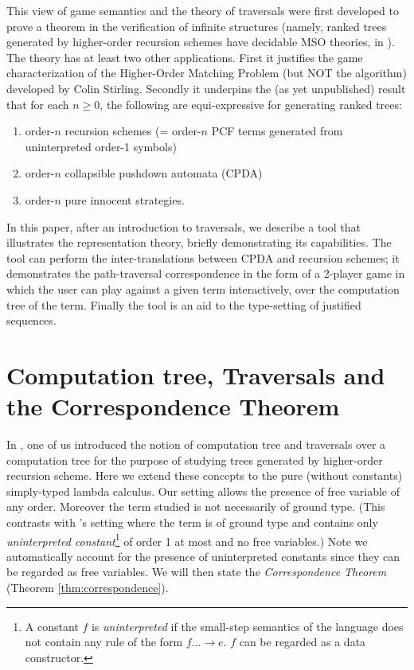 This view of game semantics and the theory of traversals were first developed to prove a theorem in the verification of infinite structures (namely, ranked trees generated by higher-order recursion schemes have decidable MSO theories, in \cite{OngLics2006}). The theory has at least two other applications. First it justifies the game characterization of the Higher-Order Matching Problem (but NOT the algorithm) developed by Colin Stirling. Secondly it underpins the (as yet unpublished) result that for each $n \geq 0$, the following are equi-expressive for generating ranked trees:
\begin{enumerate}
\item order-$n$ recursion schemes (= order-$n$ PCF terms generated from uninterpreted order-1 symbols)

\item order-$n$ collapsible pushdown automata (CPDA)

\item order-$n$ pure innocent strategies.
\end{enumerate}

In this paper, after an introduction to traversals, we describe a tool that illustrates the representation theory, briefly demonstrating its capabilities. The tool can perform the inter-translations between CPDA and recursion schemes; it demonstrates the path-traversal correspondence in the form of a 2-player game in which the user can play against a given term interactively, over the computation tree of the term. Finally the tool is an aid to the type-setting of justified sequences.

\section{Computation tree, Traversals and the Correspondence Theorem}

In \cite{OngLics2006}, one of us introduced the notion of computation tree and traversals over a computation tree for the purpose of studying trees generated by higher-order recursion scheme. Here we extend these concepts to the pure (\ie without constants) simply-typed lambda calculus. Our setting allows the presence of free variable of any order. Moreover the term studied is not necessarily of ground type. (This contrasts with \cite{OngLics2006}'s setting where the term is of ground type and contains only \emph{uninterpreted constant}\footnote{A constant $f$ is  \emph{uninterpreted} if the small-step semantics of the language
  does not contain any rule of the form $f \dots \rightarrow e$. $f$
  can be regarded as a data constructor.} of order 1 at most and no
free variables.) Note we automatically account for the presence of uninterpreted constants since they can be regarded as free variables. We will then state the \emph{Correspondence Theorem} (Theorem \ref{thm:correspondence}).

